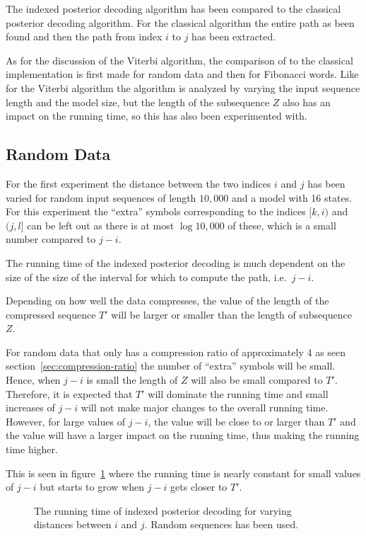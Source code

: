 The indexed posterior decoding algorithm has been compared to the classical
posterior decoding algorithm. For the classical algorithm the entire path as
been found and then the path from index $i$ to $j$ has been extracted.

As for the discussion of the Viterbi algorithm, the comparison of to the
classical implementation is first made for random data and then for Fibonacci
words. Like for the Viterbi algorithm the algorithm is analyzed by varying the
input sequence length and the model size, but the length of the subsequence $Z$
also has an impact on the running time, so this has also been experimented
with.

\subsection{Random Data}

For the first experiment the distance between the two indices $i$ and $j$ has
been varied for random input sequences of length $10,000$ and a model with 16
states. For this experiment the ``extra'' symbols corresponding to the indices
$[k, i)$ and $(j, l]$ can be left out as there is at most $\log 10,000$ of
these, which is a small number compared to $j - i$.

The running time of the indexed posterior decoding is much dependent on the
size of the size of the interval for which to compute the path, i.e.\ $j-i$.

Depending on how well the data compresses, the value of the length of the
compressed sequence $T'$ will be larger or smaller than the length of
subsequence $Z$.

 For random data that only has a compression ratio of
approximately 4 as seen section~\ref{sec:compression-ratio} the number of
``extra'' symbols will be small. Hence, when $j - i$ is small the length of $Z$
will also be small compared to $T'$. Therefore, it is expected that $T'$ will
dominate the running time and small increases of $j - i$ will not make major
changes to the overall running time. However, for large values of $j - i$, the
value will be close to or larger than $T'$ and the value will have a larger
impact on the running time, thus making the running time higher.

This is seen in
figure~\ref{fig:assymptotic_indexed_posterior_subseq_length.tex} where the
running time is nearly constant for small values of $j - i$ but starts to grow
when $j - i$ gets closer to $T'$.

\begin{figure}
  \centering
  
  \caption{The running time of indexed posterior decoding for varying distances
    between $i$ and $j$. Random sequences has been used.}
  \label{fig:assymptotic_indexed_posterior_subseq_length.tex}
\end{figure}

